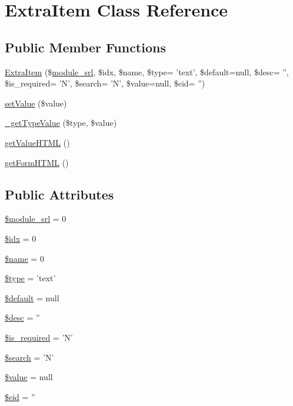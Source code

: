 \hypertarget{classExtraItem}{\section{Extra\+Item Class Reference}
\label{classExtraItem}
}
\subsection*{Public Member Functions}
\begin{DoxyCompactItemize}
\item 
\hyperlink{classExtraItem_abdf34ec801688507ddbc1acd513d2f8d}{Extra\+Item} (\$\hyperlink{ko_8install_8php_a370bb6450fab1da3e0ed9f484a38b761}{module\+\_\+srl}, \$idx, \$name, \$type= 'text', \$default=null, \$desc= '', \$is\+\_\+required= 'N', \$search= 'N', \$value=null, \$eid= '')
\item 
\hyperlink{classExtraItem_a6bec289dc0622bd882a36cb9b5680b03}{set\+Value} (\$value)
\item 
\hyperlink{classExtraItem_ac285a098cdd05b2c152b3d94c8cb95db}{\+\_\+get\+Type\+Value} (\$type, \$value)
\item 
\hyperlink{classExtraItem_a7784f081919e81e4a41ab0c250d6ca52}{get\+Value\+H\+T\+M\+L} ()
\item 
\hyperlink{classExtraItem_aaedac8843abdf391e8f4d22704606898}{get\+Form\+H\+T\+M\+L} ()
\end{DoxyCompactItemize}
\subsection*{Public Attributes}
\begin{DoxyCompactItemize}
\item 
\hyperlink{classExtraItem_a21cce86c0846b13228273314216e5ab9}{\$module\+\_\+srl} = 0
\item 
\hyperlink{classExtraItem_aadcda4aa903481b261d86bc50ab1c238}{\$idx} = 0
\item 
\hyperlink{classExtraItem_a32694a2408e9e2cca1d680356cf937d3}{\$name} = 0
\item 
\hyperlink{classExtraItem_ac965cc202d067c0449be9976045fd4be}{\$type} = 'text'
\item 
\hyperlink{classExtraItem_a8499b54a8ec7aa3e3a40201d1458ffe5}{\$default} = null
\item 
\hyperlink{classExtraItem_a47059cf3ac48f0d31c5358fa5e97f106}{\$desc} = ''
\item 
\hyperlink{classExtraItem_a616da9975ea87e9b61b6b9a2daf5e769}{\$is\+\_\+required} = 'N'
\item 
\hyperlink{classExtraItem_a086e30bc8e2d078ad1108d00ae58a60c}{\$search} = 'N'
\item 
\hyperlink{classExtraItem_a46622b49026acdfce833d5118a43986d}{\$value} = null
\item 
\hyperlink{classExtraItem_a8a68f26bb602679ebf4095e774425092}{\$eid} = ''
\end{DoxyCompactItemize}


